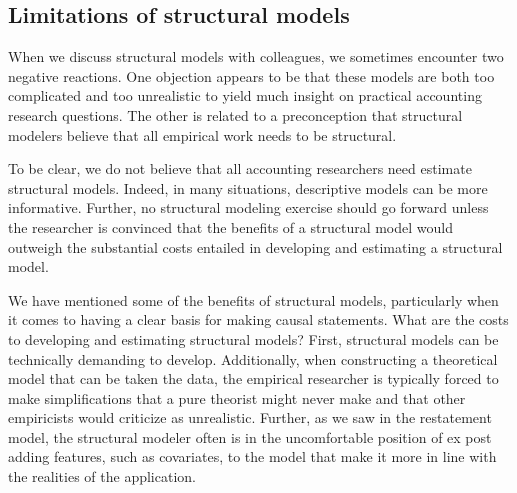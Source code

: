 \documentclass[12pt,reqno,titlepage]{amsart}
\theoremstyle{definition}
\begin{document}
\begin{doublespace}
\subsection{Limitations of structural models}

When we discuss structural models with colleagues, we sometimes encounter two negative reactions.
One objection appears to be that these models are both too complicated and too unrealistic to yield much insight on practical accounting research questions.
The other is related to a preconception that structural modelers believe that all empirical work needs to be structural.

To be clear, we do not believe that all accounting researchers need estimate structural models. 
Indeed, in many situations, descriptive models can be more informative.
Further, no structural modeling exercise should go forward unless the researcher is convinced that the benefits of a structural model would outweigh the substantial costs entailed in developing and estimating a structural model.

We have mentioned some of the benefits of structural models, particularly when it comes to having a clear basis for making causal statements.
What are the costs to developing and estimating structural models? 
First, structural models can be technically demanding to develop. 
Additionally, when constructing a theoretical model that can be taken the data, the empirical researcher is typically forced to make simplifications that a pure theorist might never make and that other empiricists would criticize as unrealistic.
Further, as we saw in the restatement model, the structural modeler often is in the uncomfortable position of ex post adding features, such as covariates, to the model that make it more in line with the realities of the application.


\end{doublespace}
\end{document}
